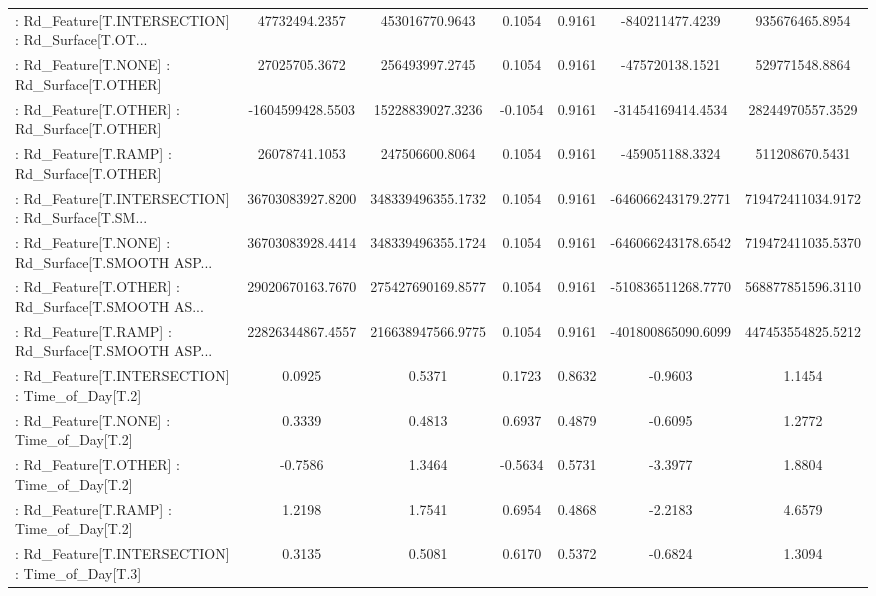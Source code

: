 \begin{longtable}{p{4cm}cccccc}
 : Rd\_Feature[T.INTERSECTION] : Rd\_Surface[T.OT... &     47732494.2357 &    453016770.9643 &  0.1054 &       0.9161 &    -840211477.4239 &    935676465.8954 \\
 : Rd\_Feature[T.NONE] : Rd\_Surface[T.OTHER]        &     27025705.3672 &    256493997.2745 &  0.1054 &       0.9161 &    -475720138.1521 &    529771548.8864 \\
 : Rd\_Feature[T.OTHER] : Rd\_Surface[T.OTHER]       &  -1604599428.5503 &  15228839027.3236 & -0.1054 &       0.9161 &  -31454169414.4534 &  28244970557.3529 \\
 : Rd\_Feature[T.RAMP] : Rd\_Surface[T.OTHER]        &     26078741.1053 &    247506600.8064 &  0.1054 &       0.9161 &    -459051188.3324 &    511208670.5431 \\
 : Rd\_Feature[T.INTERSECTION] : Rd\_Surface[T.SM... &  36703083927.8200 & 348339496355.1732 &  0.1054 &       0.9161 & -646066243179.2771 & 719472411034.9172 \\
 : Rd\_Feature[T.NONE] : Rd\_Surface[T.SMOOTH ASP... &  36703083928.4414 & 348339496355.1724 &  0.1054 &       0.9161 & -646066243178.6542 & 719472411035.5370 \\
 : Rd\_Feature[T.OTHER] : Rd\_Surface[T.SMOOTH AS... &  29020670163.7670 & 275427690169.8577 &  0.1054 &       0.9161 & -510836511268.7770 & 568877851596.3110 \\
 : Rd\_Feature[T.RAMP] : Rd\_Surface[T.SMOOTH ASP... &  22826344867.4557 & 216638947566.9775 &  0.1054 &       0.9161 & -401800865090.6099 & 447453554825.5212 \\
 : Rd\_Feature[T.INTERSECTION] : Time\_of\_Day[T.2]   &            0.0925 &            0.5371 &  0.1723 &       0.8632 &            -0.9603 &            1.1454 \\
 : Rd\_Feature[T.NONE] : Time\_of\_Day[T.2]           &            0.3339 &            0.4813 &  0.6937 &       0.4879 &            -0.6095 &            1.2772 \\
 : Rd\_Feature[T.OTHER] : Time\_of\_Day[T.2]          &           -0.7586 &            1.3464 & -0.5634 &       0.5731 &            -3.3977 &            1.8804 \\
 : Rd\_Feature[T.RAMP] : Time\_of\_Day[T.2]           &            1.2198 &            1.7541 &  0.6954 &       0.4868 &            -2.2183 &            4.6579 \\
 : Rd\_Feature[T.INTERSECTION] : Time\_of\_Day[T.3]   &            0.3135 &            0.5081 &  0.6170 &       0.5372 &            -0.6824 &            1.3094 \\

\end{longtable}
